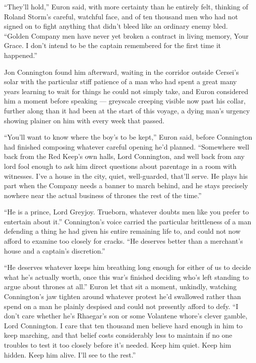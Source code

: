 “They’ll hold,” Euron said, with more certainty than he entirely felt, thinking of Roland Storm’s careful, watchful face, and of ten thousand men who had not signed on to fight anything that didn’t bleed like an ordinary enemy bled. “Golden Company men have never yet broken a contract in living memory, Your Grace. I don’t intend to be the captain remembered for the first time it happened.”

\sceneBreak

Jon Connington found him afterward, waiting in the corridor outside Cersei’s solar with the particular stiff patience of a man who had spent a great many years learning to wait for things he could not simply take, and Euron considered him a moment before speaking — greyscale creeping visible now past his collar, further along than it had been at the start of this voyage, a dying man’s urgency showing plainer on him with every week that passed.

“You’ll want to know where the boy’s to be kept,” Euron said, before Connington had finished composing whatever careful opening he’d planned. “Somewhere well back from the Red Keep’s own halls, Lord Connington, and well back from any lord fool enough to ask him direct questions about parentage in a room with witnesses. I’ve a house in the city, quiet, well-guarded, that’ll serve. He plays his part when the Company needs a banner to march behind, and he stays precisely nowhere near the actual business of thrones the rest of the time.”

“He is a prince, Lord Greyjoy. Trueborn, whatever doubts men like you prefer to entertain about it.” Connington’s voice carried the particular brittleness of a man defending a thing he had given his entire remaining life to, and could not now afford to examine too closely for cracks. “He deserves better than a merchant’s house and a captain’s discretion.”

“He deserves whatever keeps him breathing long enough for either of us to decide what he’s actually worth, once this war’s finished deciding who’s left standing to argue about thrones at all.” Euron let that sit a moment, unkindly, watching Connington’s jaw tighten around whatever protest he’d swallowed rather than spend on a man he plainly despised and could not presently afford to defy. “I don’t care whether he’s Rhaegar’s son or some Volantene whore’s clever gamble, Lord Connington. I care that ten thousand men believe hard enough in him to keep marching, and that belief costs considerably less to maintain if no one troubles to test it too closely before it’s needed. Keep him quiet. Keep him hidden. Keep him alive. I’ll see to the rest.”

